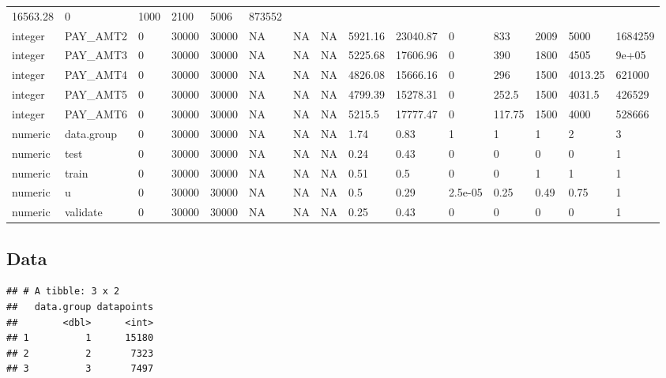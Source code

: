 \documentclass[]{article}
\newenvironment{Shaded}{\begin{snugshade}}{\end{snugshade}}
\newcommand{\DataTypeTok}[1]{\textcolor[rgb]{0.13,0.29,0.53}{#1}}
\newcommand{\KeywordTok}[1]{\textcolor[rgb]{0.13,0.29,0.53}{\textbf{#1}}}
\newcommand{\NormalTok}[1]{#1}
\newcommand{\OperatorTok}[1]{\textcolor[rgb]{0.81,0.36,0.00}{\textbf{#1}}}
\newcommand{\StringTok}[1]{\textcolor[rgb]{0.31,0.60,0.02}{#1}}
\begin{document}
\begin{longtable}[]{@{}lllllllllllllll@{}}
16563.28 & 0 & 1000 & 2100 & 5006 & 873552\tabularnewline
integer & PAY\_AMT2 & 0 & 30000 & 30000 & NA & NA & NA & 5921.16 &
23040.87 & 0 & 833 & 2009 & 5000 & 1684259\tabularnewline
integer & PAY\_AMT3 & 0 & 30000 & 30000 & NA & NA & NA & 5225.68 &
17606.96 & 0 & 390 & 1800 & 4505 & 9e+05\tabularnewline
integer & PAY\_AMT4 & 0 & 30000 & 30000 & NA & NA & NA & 4826.08 &
15666.16 & 0 & 296 & 1500 & 4013.25 & 621000\tabularnewline
integer & PAY\_AMT5 & 0 & 30000 & 30000 & NA & NA & NA & 4799.39 &
15278.31 & 0 & 252.5 & 1500 & 4031.5 & 426529\tabularnewline
integer & PAY\_AMT6 & 0 & 30000 & 30000 & NA & NA & NA & 5215.5 &
17777.47 & 0 & 117.75 & 1500 & 4000 & 528666\tabularnewline
numeric & data.group & 0 & 30000 & 30000 & NA & NA & NA & 1.74 & 0.83 &
1 & 1 & 1 & 2 & 3\tabularnewline
numeric & test & 0 & 30000 & 30000 & NA & NA & NA & 0.24 & 0.43 & 0 & 0
& 0 & 0 & 1\tabularnewline
numeric & train & 0 & 30000 & 30000 & NA & NA & NA & 0.51 & 0.5 & 0 & 0
& 1 & 1 & 1\tabularnewline
numeric & u & 0 & 30000 & 30000 & NA & NA & NA & 0.5 & 0.29 & 2.5e-05 &
0.25 & 0.49 & 0.75 & 1\tabularnewline
numeric & validate & 0 & 30000 & 30000 & NA & NA & NA & 0.25 & 0.43 & 0
& 0 & 0 & 0 & 1\tabularnewline
\bottomrule
\end{longtable}

\hypertarget{data-1}{%
\subsection{Data}\label{data-1}}

\begin{Shaded}
\end{Shaded}

\begin{verbatim}
## # A tibble: 3 x 2
##   data.group datapoints
##        <dbl>      <int>
## 1          1      15180
## 2          2       7323
## 3          3       7497
\end{verbatim}

\begin{Shaded}
\end{Shaded}
\end{document}
